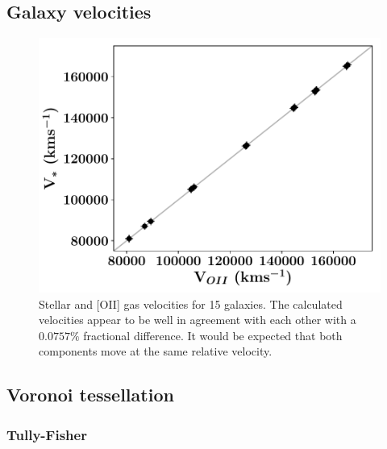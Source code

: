 \documentclass[12pt, twocolumn]{revtex4-1}    %
\begin{document}
\subsection{Galaxy velocities}
\noindent


\begin{figure}
\includegraphics[width=1.0\linewidth]{data/vel_star_vs_vel_oii}
\caption{Stellar and [OII] gas velocities for 15 galaxies. The calculated velocities appear to be well in agreement with each other with a $0.0757\%$ fractional difference. It would be expected that both components move at the same relative velocity.}
\label{fig:velocities}
\end{figure}


\vspace{2ex} %
\subsection{Voronoi tessellation}
\subsubsection{Tully-Fisher}
\noindent

\onecolumngrid
\end{document}
